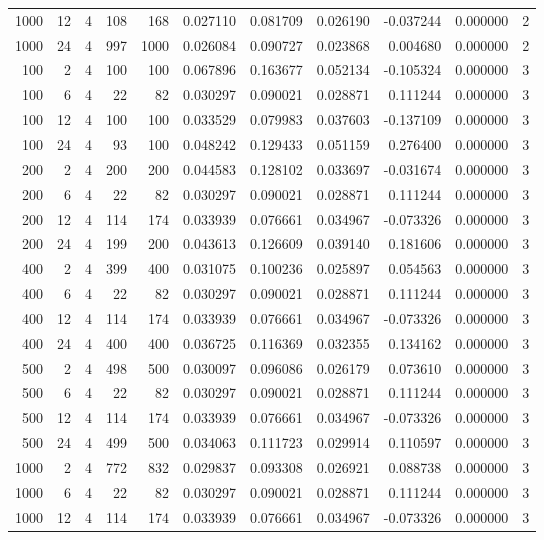 \begin{table}
\begin{tabular}{rrrrrrrrrrr}
1000 & 12 & 4 & 108 & 168 & 0.027110 & 0.081709 & 0.026190 & -0.037244 & 0.000000 & 2 \\
1000 & 24 & 4 & 997 & 1000 & 0.026084 & 0.090727 & 0.023868 & 0.004680 & 0.000000 & 2 \\
100 & 2 & 4 & 100 & 100 & 0.067896 & 0.163677 & 0.052134 & -0.105324 & 0.000000 & 3 \\
100 & 6 & 4 & 22 & 82 & 0.030297 & 0.090021 & 0.028871 & 0.111244 & 0.000000 & 3 \\
100 & 12 & 4 & 100 & 100 & 0.033529 & 0.079983 & 0.037603 & -0.137109 & 0.000000 & 3 \\
100 & 24 & 4 & 93 & 100 & 0.048242 & 0.129433 & 0.051159 & 0.276400 & 0.000000 & 3 \\
200 & 2 & 4 & 200 & 200 & 0.044583 & 0.128102 & 0.033697 & -0.031674 & 0.000000 & 3 \\
200 & 6 & 4 & 22 & 82 & 0.030297 & 0.090021 & 0.028871 & 0.111244 & 0.000000 & 3 \\
200 & 12 & 4 & 114 & 174 & 0.033939 & 0.076661 & 0.034967 & -0.073326 & 0.000000 & 3 \\
200 & 24 & 4 & 199 & 200 & 0.043613 & 0.126609 & 0.039140 & 0.181606 & 0.000000 & 3 \\
400 & 2 & 4 & 399 & 400 & 0.031075 & 0.100236 & 0.025897 & 0.054563 & 0.000000 & 3 \\
400 & 6 & 4 & 22 & 82 & 0.030297 & 0.090021 & 0.028871 & 0.111244 & 0.000000 & 3 \\
400 & 12 & 4 & 114 & 174 & 0.033939 & 0.076661 & 0.034967 & -0.073326 & 0.000000 & 3 \\
400 & 24 & 4 & 400 & 400 & 0.036725 & 0.116369 & 0.032355 & 0.134162 & 0.000000 & 3 \\
500 & 2 & 4 & 498 & 500 & 0.030097 & 0.096086 & 0.026179 & 0.073610 & 0.000000 & 3 \\
500 & 6 & 4 & 22 & 82 & 0.030297 & 0.090021 & 0.028871 & 0.111244 & 0.000000 & 3 \\
500 & 12 & 4 & 114 & 174 & 0.033939 & 0.076661 & 0.034967 & -0.073326 & 0.000000 & 3 \\
500 & 24 & 4 & 499 & 500 & 0.034063 & 0.111723 & 0.029914 & 0.110597 & 0.000000 & 3 \\
1000 & 2 & 4 & 772 & 832 & 0.029837 & 0.093308 & 0.026921 & 0.088738 & 0.000000 & 3 \\
1000 & 6 & 4 & 22 & 82 & 0.030297 & 0.090021 & 0.028871 & 0.111244 & 0.000000 & 3 \\
1000 & 12 & 4 & 114 & 174 & 0.033939 & 0.076661 & 0.034967 & -0.073326 & 0.000000 & 3 \\

\end{tabular}
\end{table}
